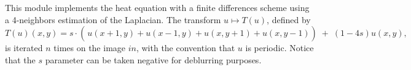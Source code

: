 This module implements the heat equation with a finite differences 
scheme using a 4-neighbors estimation of the Laplacian. The 
transform $u\mapsto T(u)$, defined by
$$T(u)(x,y) = 
s \cdot \left( \frac{}{} u(x+1,y)+u(x-1,y)+u(x,y+1)+u(x,y-1) \right)
\; + \; (1-4s) u(x,y),$$
is iterated $n$ times on the image $in$, with the convention
that $u$ is periodic. Notice that the $s$ parameter can be
taken negative for deblurring purposes.